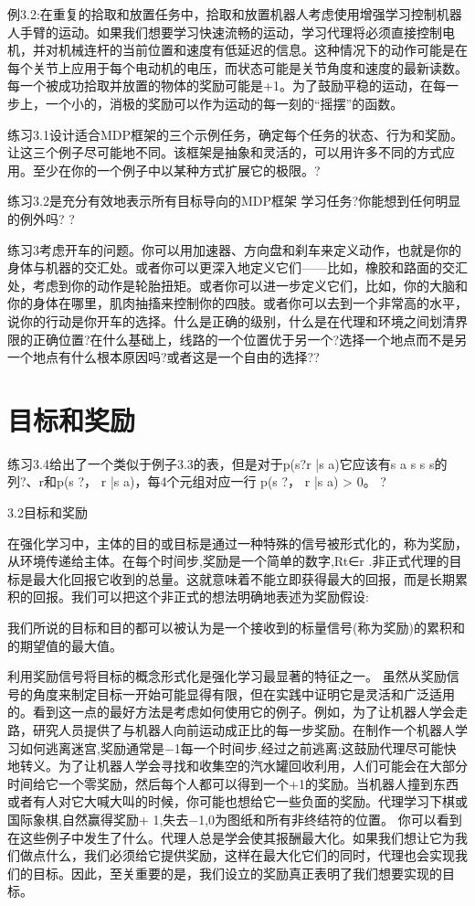 例3.2:在重复的拾取和放置任务中，拾取和放置机器人考虑使用增强学习控制机器人手臂的运动。如果我们想要学习快速流畅的运动，学习代理将必须直接控制电机，并对机械连杆的当前位置和速度有低延迟的信息。这种情况下的动作可能是在每个关节上应用于每个电动机的电压，而状态可能是关节角度和速度的最新读数。每一个被成功拾取并放置的物体的奖励可能是+1。为了鼓励平稳的运动，在每一步上，一个小的，消极的奖励可以作为运动的每一刻的“摇摆”的函数。

练习3.1设计适合MDP框架的三个示例任务，确定每个任务的状态、行为和奖励。让这三个例子尽可能地不同。该框架是抽象和灵活的，可以用许多不同的方式应用。至少在你的一个例子中以某种方式扩展它的极限。?

练习3.2是充分有效地表示所有目标导向的MDP框架
学习任务?你能想到任何明显的例外吗? 					?

练习3考虑开车的问题。你可以用加速器、方向盘和刹车来定义动作，也就是你的身体与机器的交汇处。或者你可以更深入地定义它们——比如，橡胶和路面的交汇处，考虑到你的动作是轮胎扭矩。或者你可以进一步定义它们，比如，你的大脑和你的身体在哪里，肌肉抽搐来控制你的四肢。或者你可以去到一个非常高的水平，说你的行动是你开车的选择。什么是正确的级别，什么是在代理和环境之间划清界限的正确位置?在什么基础上，线路的一个位置优于另一个?选择一个地点而不是另一个地点有什么根本原因吗?或者这是一个自由的选择??

\section{目标和奖励}

练习3.4给出了一个类似于例子3.3的表，但是对于p(s?r |s a)它应该有s a s s s的列?、r和p(s ?， r |s a)，每4个元组对应一行
p(s ?， r |s a) > 0。 					?

3.2目标和奖励

在强化学习中，主体的目的或目标是通过一种特殊的信号被形式化的，称为奖励，从环境传递给主体。在每个时间步,奖励是一个简单的数字,Rt∈r .非正式代理的目标是最大化回报它收到的总量。这就意味着不能立即获得最大的回报，而是长期累积的回报。我们可以把这个非正式的想法明确地表述为奖励假设:

我们所说的目标和目的都可以被认为是一个接收到的标量信号(称为奖励)的累积和的期望值的最大值。

利用奖励信号将目标的概念形式化是强化学习最显著的特征之一。
虽然从奖励信号的角度来制定目标一开始可能显得有限，但在实践中证明它是灵活和广泛适用的。看到这一点的最好方法是考虑如何使用它的例子。例如，为了让机器人学会走路，研究人员提供了与机器人向前运动成正比的每一步奖励。在制作一个机器人学习如何逃离迷宫,奖励通常是−1每一个时间步,经过之前逃离;这鼓励代理尽可能快地转义。为了让机器人学会寻找和收集空的汽水罐回收利用，人们可能会在大部分时间给它一个零奖励，然后每个人都可以得到一个+1的奖励。当机器人撞到东西或者有人对它大喊大叫的时候，你可能也想给它一些负面的奖励。代理学习下棋或国际象棋,自然赢得奖励+ 1,失去−1,0为图纸和所有非终结符的位置。
你可以看到在这些例子中发生了什么。代理人总是学会使其报酬最大化。如果我们想让它为我们做点什么，我们必须给它提供奖励，这样在最大化它们的同时，代理也会实现我们的目标。因此，至关重要的是，我们设立的奖励真正表明了我们想要实现的目标。

